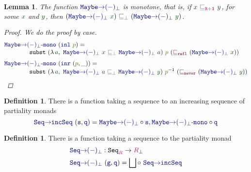 \documentclass[twoside,11pt,openright]{report}
\theoremstyle{plain} %
\newtheorem{lem}[thm]{Lemma}
\theoremstyle{definition}
\newtheorem{defn}[thm]{Definition}%
\theoremstyle{remark}
\newcommand*{\term}[1]{\textcolor{green!30!black}{#1}} %
\newcommand*{\pathterm}[1]{\textcolor{green!65!red!75!black}{#1}}
\newcommand*{\type}[1]{\textcolor{magenta!90!black}{#1}}
\newcommand*{\unit}{\type{\textbf{1}}}
\newcommand*{\relation}[1]{\textcolor{gray!75!black}{\ensuremath{\mathtt{#1}}}}
\newcommand*{\function}[1]{\textcolor{blue!60!black}{\ensuremath{\mathtt{#1}}}}
\newcommand*{\constructor}[1]{\textcolor{purple!60!black}{\ensuremath{\mathtt{#1}}}}
\newcommand*{\typeformer}[1]{\ensuremath{\mathtt{#1}}}
\newcommand*{\sym}[1]{\ensuremath{#1^{-1}}}
\begin{document}
\begin{lem}
  The function \(\function{Maybe{\rightarrow}(-)_\bot}\) is monotone, that is, if \(\term{x}~\relation{\sqsubseteq_{\type{R} + \unit}}~\term{y}\), for some \(\term{x}\) and \(\term{y}\), then \((\function{Maybe{\rightarrow}(-)_\bot}~\term{x})~\relation{\sqsubseteq_{\bot}}~(\function{Maybe{\rightarrow}(-)_\bot}~\term{y})\).
  \begin{proof}
    We do the proof by case.
    \begin{equation}
      \begin{aligned}
        &\function{Maybe{\rightarrow}(-)_\bot\text{-}mono}~(\function{inl}~\pathterm{p}) = \\[-1mm]
        &\qquad\qquad \mathtt{subst}~(\lambda\,\term{a},~\function{Maybe{\rightarrow}(-)_\bot}~\term{x}~\relation{\sqsubseteq_{\bot}}~\function{Maybe{\rightarrow}(-)_\bot}~\term{a})~\pathterm{p}~(\constructor{\sqsubseteq_{refl}}~(\function{Maybe{\rightarrow}(-)_\bot}~\term{x})) \\[1mm]
        &\function{Maybe{\rightarrow}(-)_\bot\text{-}mono}~(\function{inr}~(\pathterm{p}, \_)) = \\[-1mm]
        &\qquad\qquad \mathtt{subst}~(\lambda\,\term{a},~\function{Maybe{\rightarrow}(-)_\bot}~\term{a}~\relation{\sqsubseteq_{\bot}}~\function{Maybe{\rightarrow}(-)_\bot}~\term{y})~\sym{\pathterm{p}}~(\constructor{\sqsubseteq_{never}}~(\function{Maybe{\rightarrow}(-)_\bot}~\term{y}))
      \end{aligned}
    \end{equation}
  \end{proof}
\end{lem}
\begin{defn}
  There is a function taking a sequence to an increasing sequence of partiality monads
  \begin{equation}
      \function{Seq{\rightarrow}incSeq}~(\function{s} , \function{q}) = \function{Maybe{\rightarrow}(-)_\bot} \circ \function{s} , \function{Maybe{\rightarrow}(-)_\bot\text{-}mono} \circ \function{q}
  \end{equation}
\end{defn}
\begin{defn}
  There is a function taking a sequence to the partiality monad
  \begin{equation}
    \begin{aligned}
      &\function{Seq{\rightarrow}(-)_\bot} : \typeformer{Seq}_{\type{R}} \rightarrow \type{R}_{\bot} \\
      &\function{Seq{\rightarrow}(-)_\bot}~(\function{g},\function{q}) = \bigsqcup \circ~\function{Seq{\rightarrow}incSeq}
    \end{aligned}
  \end{equation}
\end{defn}
\end{document}
